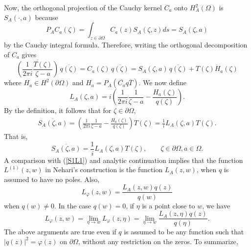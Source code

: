 \documentclass[11pt, reqno]{amsart}
\numberwithin{equation}{section}
\newcommand{\ov}{\overline}
\newcommand{\Om}{\Omega}
\begin{document}
Now, the orthogonal projection of the Cauchy kernel $C_a$ onto $H_A^2(\Om)$ is $S_A(\cdot,a)$ because
\[
P_A C_a (\zeta) = \int_{z\in\partial \Om} C_a(z) S_A(\zeta,z) ds = S_A(\zeta,a)
\]
by the Cauchy integral formula. Therefore, writing the orthogonal decomposition of $C_a$ gives
\[
\overline{\left(\frac{1}{2\pi i} \frac{T(\zeta)}{\zeta - a}\right)}\, \ov{q(\zeta)}
=
C_a(\zeta)\, \ov{q(\zeta)}
= S_A(\zeta,a)\, \ov{q(\zeta)} + \overline{T(\zeta) H_a(\zeta)}
\]
where $H_a\in H^2(\partial\Om)$ and $H_a = P_A(\ov{C_a} q \ov{T})$. We now define
\begin{equation}
L_A(\zeta,a) = i \left( \frac{1}{2\pi i} \frac{1}{\zeta - a} - \frac{H_a(\zeta)}{q(\zeta)}\right).
\end{equation}
By the definition, it follows that for $\zeta\in\partial\Om$,
\begin{eqnarray*}
\overline{S_A(\zeta,a)} = \left( \frac{1}{2\pi i} \frac{1}{\zeta - a} - \frac{H_a(\zeta)}{q(\zeta)} \right) T(\zeta) = \frac{1}{i} L_A(\zeta,a) T(\zeta).
\end{eqnarray*}
That is,
\begin{equation}
\overline{S_A(\zeta,a)} = \frac{1}{i} L_A(\zeta,a) T(\zeta),
\quad \quad \zeta\in\partial\Om, a\in\Om.
\end{equation}
A comparison with (\ref{S1L1}) and analytic continuation implies that the function $L^{(1)}(z,w)$ in Nehari's construction is the function $L_A(z,w)$, when $q$ is assumed to have no poles. Also,
\begin{equation}
L_{\varphi}(z,w) = \frac{L_A(z,w) q(z)}{q(w)}
\end{equation}
when $q(w)\neq 0$. In the case $q(w) = 0$, if $\eta$ is a point close to $w$, we have
\begin{equation}
L_{\varphi}(z,w) = \lim\limits_{\eta\rightarrow w} L_{\varphi}(z,\eta) 
=
\lim\limits_{\eta\rightarrow w}\frac{L_A(z,\eta) q(z)}{q(\eta)}.
\end{equation}
The above arguments are true even if $q$ is assumed to be any function such that $\vert q(z)\vert^2 = \varphi(z)$ on $\partial\Om$, without any restriction on the zeros.
To summarize,
\end{document}
